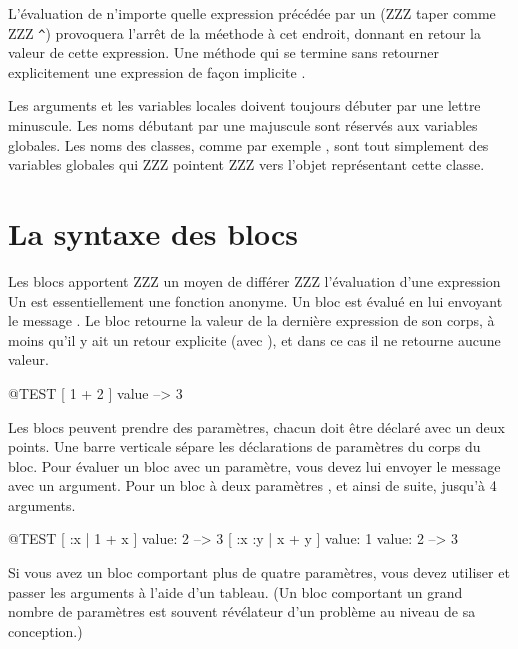 \documentclass[a4paper,10pt,twoside]{book}
\begin{document}
L'\'{e}valuation de n'importe quelle expression pr\'{e}c\'{e}d\'{e}e par un \ct{^} (ZZZ taper comme ZZZ \verb|^|) provoquera l'arr\^{e}t de la m\'{e}ethode \`{a} cet endroit, donnant en retour la valeur de cette expression.
Une m\'{e}thode qui se termine sans retourner explicitement une expression 
 de fa\c{c}on implicite .


Les arguments et les variables locales doivent toujours d\'{e}buter par une lettre minuscule.
Les noms d\'{e}butant par une majuscule sont r\'{e}servés aux variables globales.
Les noms des classes, comme par exemple , sont tout simplement des variables globales qui ZZZ pointent ZZZ vers l'objet repr\'{e}sentant cette classe.

\section{La syntaxe des blocs}

Les blocs apportent ZZZ un moyen de diff\'{e}rer ZZZ l'\'{e}valuation d'une expression
Un  est essentiellement une fonction anonyme. Un bloc est \'{e}valu\'{e} en lui envoyant le message .
Le bloc retourne la valeur de la derni\`{e}re expression de son corps, \`{a} moins qu'il y ait un retour explicite (avec \ct{^}), et dans ce cas il ne retourne aucune valeur.

\begin{code}{@TEST}
[ 1 + 2 ] value --> 3
\end{code}

Les blocs peuvent prendre des param\`{e}tres, chacun doit \^{e}tre d\'{e}clar\'{e}
avec un deux points.
Une barre verticale s\'{e}pare les d\'{e}clarations de param\`{e}tres du corps du bloc.
Pour \'{e}valuer un bloc avec un param\`{e}tre, vous devez lui envoyer le message 
  avec un argument.
Pour un bloc \`{a} deux param\`{e}tres  , et ainsi de suite, jusqu'\`{a} 4 arguments.

\begin{code}{@TEST}
[ :x | 1 + x ] value: 2 --> 3
[ :x :y | x + y ] value: 1 value: 2 --> 3
\end{code}

Si vous avez un bloc comportant plus de quatre param\`{e}tres, vous devez utiliser
 et passer les arguments à l'aide d'un tableau.
(Un bloc comportant un grand nombre de param\`{e}tres est souvent r\'{e}v\'{e}lateur d'un probl\`{e}me au niveau de sa conception.)
\end{document}
